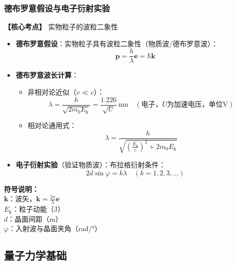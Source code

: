\subsubsection{德布罗意假设与电子衍射实验}
\textbf{【核心考点】} 实物粒子的波粒二象性 \par\vspace{0.3em}
\begin{itemize}
    \item \textbf{德布罗意假设}：实物粒子具有波粒二象性（物质波/德布罗意波）：
          \[
          \boldsymbol{p} = \frac{h}{\lambda} \boldsymbol{e} = \hbar \boldsymbol{k}
          \]
    \item \textbf{德布罗意波长计算}：
          \begin{itemize}
              \item 非相对论近似（$v\ll c$）：
                    \[
                    \lambda = \frac{h}{\sqrt{2m_0 E_{\text{k}}}} = \frac{1.226}{\sqrt{U}}\ \text{nm} \quad (\text{电子，}U\text{为加速电压，单位V})
                    \]
              \item 相对论通用式：
                    \[
                    \lambda = \frac{h}{\sqrt{\left( \frac{E_{\text{k}}}{c} \right)^2 + 2m_0 E_{\text{k}}}}
                    \]
          \end{itemize}
    \item \textbf{电子衍射实验}（验证物质波）：布拉格衍射条件：
          \[
          2d\sin\varphi = k\lambda \quad (k=1,2,3,\dots)
          \]
\end{itemize}

\textbf{符号说明：}\\
$\boldsymbol{k}$：波矢，$\boldsymbol{k} = \frac{2\pi}{\lambda} \boldsymbol{e}$ \\
$E_{\text{k}}$：粒子动能（J） \\
$d$：晶面间距（m） \\
$\varphi$：入射波与晶面夹角（rad/°）
\vspace{0.5em}

\subsection{量子力学基础}

